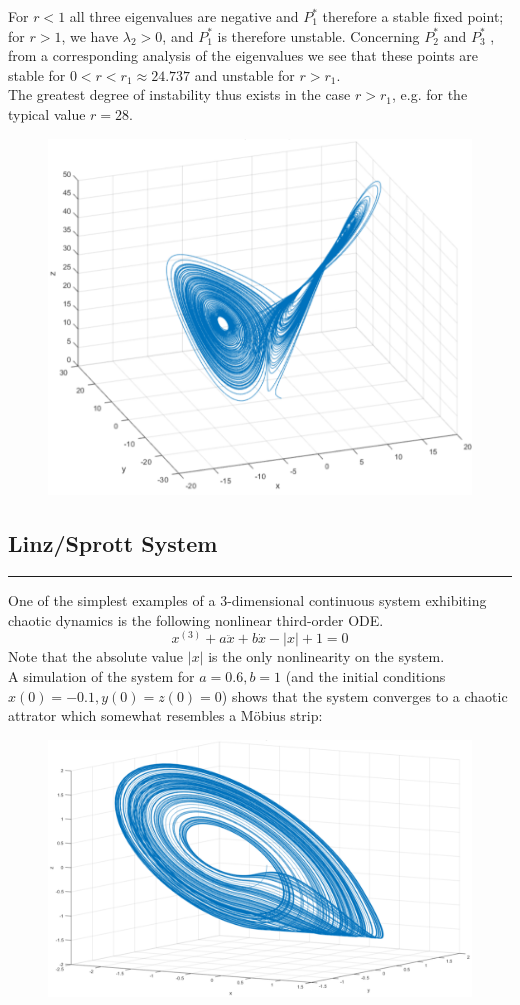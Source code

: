 For $r < 1$ all three eigenvalues are negative and $P_1^*$ therefore a stable fixed point; for $r > 1$, we have $\lambda_2 > 0$, and $P_1^*$ is therefore unstable. Concerning $P_2^*$ and $P_3^*$ , from a corresponding analysis of the eigenvalues we see that these points are stable for $0 < r < r_1 \approx 24.737$ and unstable for $r > r_1$.\\

The greatest degree of instability thus exists in the case $r > r_1$, e.g. for the typical value $r = 28$.

\begin{figure}[H]
  \centering
  \includegraphics[width=.7\linewidth]{Pics/4.54.png}
\end{figure}

\subsection{Linz/Sprott System}
\noindent\rule[\linienAbstand]{\linewidth}{\linienDicke}
One of the simplest examples of a 3-dimensional continuous system exhibiting chaotic dynamics is the following nonlinear third-order ODE.
\begin{equation}
  x^{(3)} + a \ddot{x} + b\dot{x} - |x| + 1 = 0
\end{equation}
Note that the absolute value $|x|$ is the only nonlinearity on the system.\\
A simulation of the system for $a = 0.6, b = 1$ (and the initial conditions $x(0) = -0.1, y(0) = z(0) = 0$) shows that the system converges to a chaotic attrator which somewhat resembles a Möbius strip:

\begin{figure}[H]
  \centering
  \includegraphics[width=.7\linewidth]{Pics/4.58.png}
\end{figure}
\vfill\null
\columnbreak
